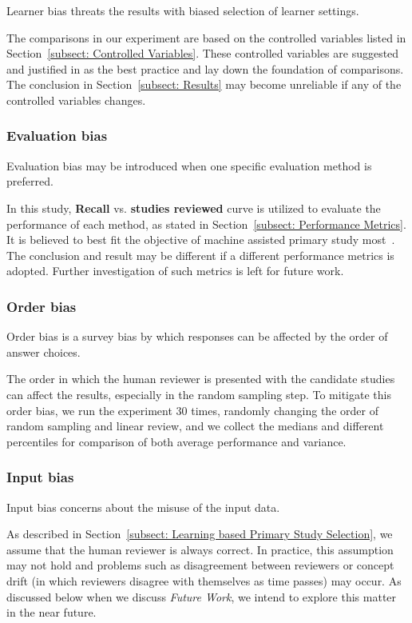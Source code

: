 \documentclass[final,twocolumn,5p]{elsarticle}
\theoremstyle{break}
\begin{document}
Learner bias threats the results with biased selection of learner settings.

The comparisons in our experiment are based on the controlled variables listed in Section~\ref{subsect: Controlled Variables}. These controlled variables are suggested and justified in \cite{krishna2016bigse} as the best practice and lay down the foundation of comparisons. The conclusion in Section~\ref{subsect: Results} may become unreliable if any of the controlled variables changes.

\subsubsection{Evaluation bias}

Evaluation bias may be introduced when one specific evaluation method is preferred.

In this study, \textbf{Recall} vs. \textbf{studies reviewed} curve is utilized to evaluate the performance of each method, as stated in Section~\ref{subsect: Performance Metrics}. It is believed to best fit the objective of machine assisted primary study most~\cite{tredennick2015,cormack2015autonomy,cormack2014evaluation}. The conclusion and result may be different if a different performance metrics is adopted. Further investigation of such metrics is left for future work.

\subsubsection{Order bias}

Order bias is a survey bias by which responses can be affected by the order of answer choices.

The order in which the human reviewer is presented with the candidate studies can affect the results, especially in the random sampling step. To mitigate this order bias, we run the experiment 30 times, randomly changing the order of random sampling and linear review,  and we collect the medians and different percentiles for comparison of both average performance and variance.

\subsubsection{Input bias}

Input bias concerns about the misuse of the input data.

As described in Section~\ref{subsect: Learning based Primary Study Selection}, we assume that the human reviewer is always correct. In practice, this assumption may not hold and problems such as disagreement between reviewers or concept drift (in which reviewers disagree with themselves as time passes) may occur.  As discussed
below when we discuss {\em Future Work}, we intend to explore this matter in the near future.
\end{document}
